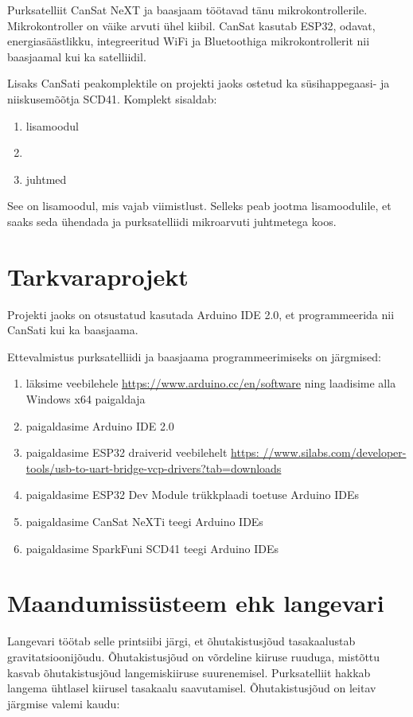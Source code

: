 Purksatelliit CanSat NeXT ja baasjaam töötavad tänu mikrokontrollerile. Mikrokontroller on väike arvuti ühel kiibil. CanSat kasutab ESP32, odavat, energiasäästlikku, integreeritud WiFi ja Bluetoothiga mikrokontrollerit nii baasjaamal kui ka satelliidil.

Lisaks CanSati peakomplektile on projekti jaoks ostetud ka süsihappegaasi- ja niiskusemõõtja SCD41. 
Komplekt sisaldab: 
\begin{enumerate}
    \item lisamoodul 
    \item {}
    \item juhtmed
\end{enumerate}

See on lisamoodul, mis vajab viimistlust. Selleks peab jootma  lisamoodulile, et saaks seda ühendada ja purksatelliidi mikroarvuti juhtmetega koos.

\section{Tarkvaraprojekt}

Projekti jaoks on otsustatud kasutada Arduino IDE 2.0, et programmeerida nii CanSati kui ka baasjaama.

Ettevalmistus purksatelliidi ja baasjaama programmeerimiseks on järgmised:

\begin{enumerate}
    \item läksime veebilehele \url{https://www.arduino.cc/en/software} ning laadisime alla Windows x64 paigaldaja
    \item paigaldasime Arduino IDE 2.0
    \item paigaldasime ESP32 draiverid veebilehelt \url{https: //www.silabs.com/developer-tools/usb-to-uart-bridge-vcp-drivers?tab=downloads }
    \item paigaldasime ESP32 Dev Module trükkplaadi toetuse Arduino IDEs
    \item paigaldasime CanSat NeXTi teegi Arduino IDEs
    \item paigaldasime SparkFuni SCD41 teegi Arduino IDEs
\end{enumerate}

\section{Maandumissüsteem ehk langevari }

Langevari töötab selle printsiibi järgi, et õhutakistusjõud tasakaalustab gravitatsioonijõudu. Õhutakistusjõud on võrdeline kiiruse ruuduga, mistõttu kasvab õhutakistusjõud langemiskiiruse suurenemisel. Purksatelliit hakkab langema ühtlasel kiirusel tasakaalu saavutamisel. Õhutakistusjõud on leitav järgmise valemi kaudu:

